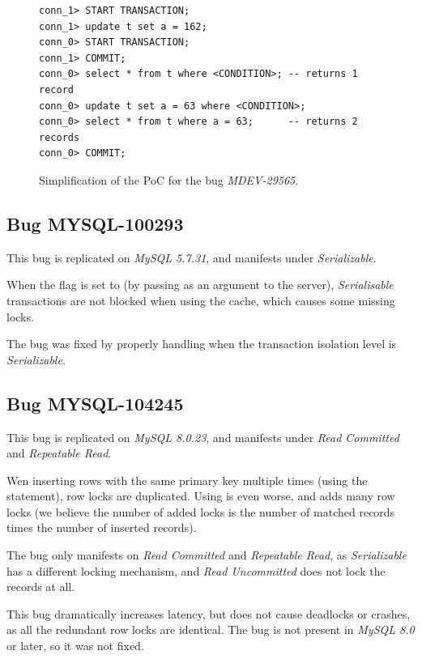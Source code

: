 \begin{figure}[H]
\begin{verbatim}
conn_1> START TRANSACTION;
conn_1> update t set a = 162;
conn_0> START TRANSACTION;
conn_1> COMMIT;
conn_0> select * from t where <CONDITION>; -- returns 1 record
conn_0> update t set a = 63 where <CONDITION>;
conn_0> select * from t where a = 63;      -- returns 2 records
conn_0> COMMIT;
\end{verbatim}
\caption{Simplification of the PoC for the bug \textit{MDEV-29565}.} \label{fig:MDEV-29565}
\end{figure}


\subsection*{Bug MYSQL-100293}

This bug is replicated on \textit{MySQL 5.7.31}, and manifests under \textit{Serializable}.

When the  flag is set to  (by passing  as an argument to the server), \textit{Serialisable} transactions are not blocked when using the cache, which causes some missing locks.

The bug was fixed by properly handling  when the transaction isolation level is \textit{Serializable}.

\subsection*{Bug MYSQL-104245}


This bug is replicated on \textit{MySQL 8.0.23}, and manifests under \textit{Read Committed} and \textit{Repeatable Read}.

Wen inserting rows with the same primary key multiple times (using the  statement), row locks are duplicated. Using  is even worse, and adds many row locks (we believe the number of added locks is the number of matched records times the number of inserted records).

The bug only manifests on \textit{Read Committed} and \textit{Repeatable Read}, as \textit{Serializable} has a different locking mechanism, and \textit{Read Uncommitted} does not lock the records at all.

This bug dramatically increases latency, but does not cause deadlocks or crashes, as all the redundant row locks are identical. The bug is not present in \textit{MySQL 8.0} or later, so it was not fixed.


